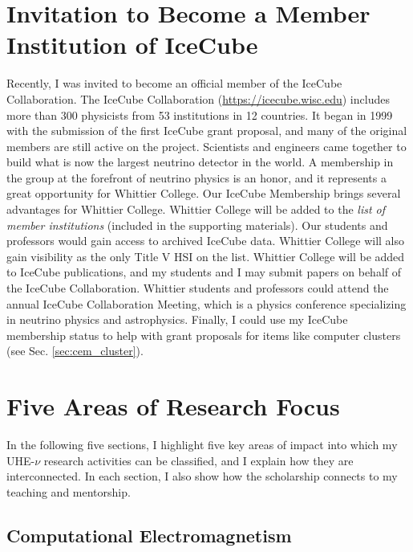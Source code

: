 \documentclass[../../../main.tex]{subfiles}
\begin{document}
\section{Invitation to Become a Member Institution of IceCube}
\label{sec:invite}

Recently, I was invited to become an official member of the IceCube Collaboration.  The IceCube Collaboration (\url{https://icecube.wisc.edu}) includes more than 300 physicists from 53 institutions in 12 countries. It began in 1999 with the submission of the first IceCube grant proposal, and many of the original members are still active on the project.  Scientists and engineers came together to build what is now the largest neutrino detector in the world.  A membership in the group at the forefront of neutrino physics is an honor, and it represents a great opportunity for Whittier College.  Our IceCube Membership brings several advantages for Whittier College.  Whittier College will be added to the \textit{list of member institutions} (included in the supporting materials).  Our students and professors would gain access to archived IceCube data.  Whittier College will also gain visibility as the only Title V HSI on the list.  Whittier College will be added to IceCube publications, and my students and I may submit papers on behalf of the IceCube Collaboration.  Whittier students and professors could attend the annual IceCube Collaboration Meeting, which is a physics conference specializing in neutrino physics and astrophysics.  Finally, I could use my IceCube membership status to help with grant proposals for items like computer clusters (see Sec. \ref{sec:cem_cluster}).

\section{Five Areas of Research Focus}
\label{sec:neutrino}

In the following five sections, I highlight five key areas of impact into which my UHE-$\nu$ research activities can be classified, and I explain how they are interconnected.  In each section, I also show how the scholarship connects to my teaching and mentorship.

\subsection{Computational Electromagnetism}
\label{sec:cem}
\end{document}
